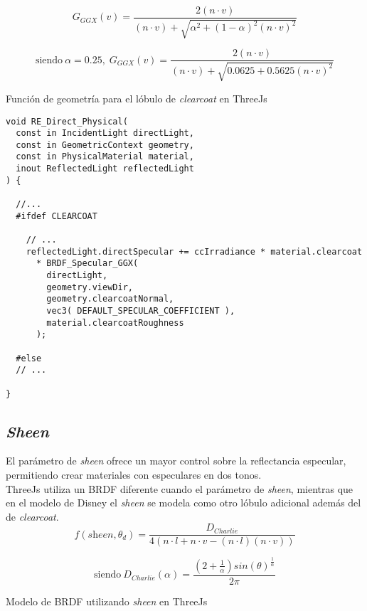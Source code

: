 \begin{eqfloat}
  $$
  G_{GGX}(v) = \frac
  {2 (n \cdot{v})}
  {(n \cdot{v}) + \sqrt{ \alpha^2 + (1 - \alpha)^2 (n \cdot{v})^2 }}
  $$
  \begin{eqfloat}[!htb]
    \begin{equation}
    \textrm{siendo}\ \alpha=0.25,\;
    G_{GGX}(v) = \frac
    {2 (n \cdot{v})}
    {(n \cdot{v}) + \sqrt{ 0.0625 + 0.5625 (n \cdot{v})^2 }}
    \end{equation}
  \caption{Funci\'on de geometr\'ia para el l\'obulo de \textit{clearcoat} en ThreeJs}
  \end{eqfloat}
  \singlespacing

  \begin{lstlisting}[caption={Implementaci\'on del l\'obulo de \textit{clearcoat} en ThreeJs}]
void RE_Direct_Physical(
  const in IncidentLight directLight,
  const in GeometricContext geometry,
  const in PhysicalMaterial material,
  inout ReflectedLight reflectedLight
) {

  //...
  #ifdef CLEARCOAT

    // ...
    reflectedLight.directSpecular += ccIrradiance * material.clearcoat
      * BRDF_Specular_GGX(
        directLight,
        geometry.viewDir,
        geometry.clearcoatNormal,
        vec3( DEFAULT_SPECULAR_COEFFICIENT ),
        material.clearcoatRoughness
      );

  #else
  // ...

}
  \end{lstlisting}
  
  \subsection*{\textit{Sheen}}
  El par\'ametro de \textit{sheen} ofrece un mayor control sobre la reflectancia especular, permitiendo crear materiales con
  especulares en dos tonos.\\

  ThreeJs utiliza un BRDF diferente cuando el par\'ametro de \textit{sheen}, mientras que en el modelo de Disney el \textit{sheen}
  se modela como otro l\'obulo adicional adem\'as del de \textit{clearcoat}.\\

  $$
  f(\textit{sheen}, \theta_d) =\frac{D_{Charlie}}{4(n\cdot{l} + n\cdot{v} - (n\cdot{l})(n\cdot{v}) )}
  $$
  \begin{eqfloat}[!htb]
    \begin{equation}
      \textrm{siendo}\ D_{Charlie}(\alpha) = \frac
      {(2 + \frac{1}{\alpha})sin(\theta)^\frac{1}{\alpha}}
      {2\pi}
    \end{equation}
  \caption{Modelo de BRDF utilizando \textit{sheen} en ThreeJs}
  \end{eqfloat}
  \singlespacing


\end{eqfloat}
